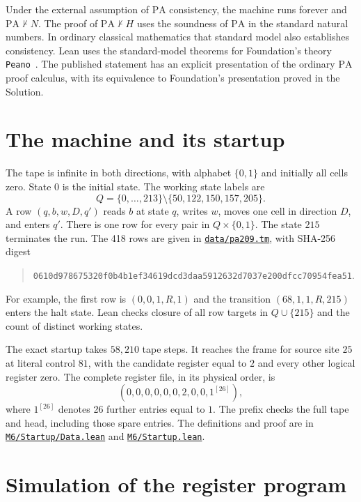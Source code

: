 \documentclass[11pt,letterpaper]{article}
\newcommand{\PA}{\mathrm{PA}}
\newcommand{\src}[2]{\href{https://github.com/jamesyc/BusyBeaver/blob/main/#1}{\texttt{\nolinkurl{#2}}}}
\begin{document}
Under the external assumption of $\PA$ consistency, the machine runs
forever and $\PA\nvdash N$. The proof of $\PA\nvdash H$ uses the
soundness of $\PA$ in the standard natural numbers. In ordinary classical
mathematics that standard model also establishes consistency. Lean
uses the standard-model theorems for Foundation's theory
\texttt{Peano}~\cite{foundation}. The published statement has an explicit
presentation of the ordinary $\PA$ proof calculus, with its equivalence
to Foundation's presentation proved in the Solution.

\section{The machine and its startup}\label{sec:machine}

The tape is infinite in both directions, with alphabet $\{0,1\}$ and
initially all cells zero. State $0$ is the initial state. The working
state labels are
\[
            Q=\{0,\ldots,213\}\setminus\{50,122,150,157,205\}.
\]
A row $(q,b,w,D,q')$ reads $b$ at state $q$, writes $w$, moves one cell in
direction $D$, and enters $q'$. There is one row for every pair
in $Q\times\{0,1\}$. The state $215$ terminates the run. The 418 rows are
given in \src{data/pa209.tm}{data/pa209.tm}, with SHA-256 digest
\begin{quote}\small
\nolinkurl{0610d978675320f0b4b1ef34619dcd3daa5912632d7037e200dfcc70954fea51}.
\end{quote}
For example, the first row is $(0,0,1,R,1)$ and the transition
$(68,1,1,R,215)$ enters the halt state. Lean checks closure of all row
targets in $Q\cup\{215\}$ and the count of distinct working states.

The exact startup takes $58{,}210$ tape steps. It reaches the frame for
source site $25$ at literal control $81$, with the candidate register
equal to $2$ and every other logical register zero. The complete
register file, in its physical order, is
\[
              (0,0,0,0,0,0,2,0,0,1^{[26]}),
\]
where $1^{[26]}$ denotes 26 further entries equal to $1$. The prefix
checks the full tape and head, including those spare entries. The
definitions and proof are in \src{M6/Startup/Data.lean}{M6/Startup/Data.lean}
and \src{M6/Startup.lean}{M6/Startup.lean}.

\section{Simulation of the register program}\label{sec:physical}
\end{document}
